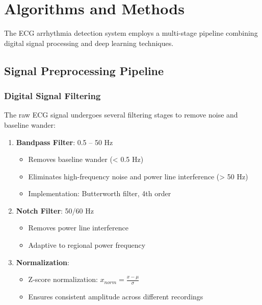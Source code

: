 \documentclass[12pt,a4paper]{article}
\begin{document}
\section{Algorithms and Methods}

The ECG arrhythmia detection system employs a multi-stage pipeline combining digital signal processing and deep learning techniques.

\subsection{Signal Preprocessing Pipeline}

\subsubsection{Digital Signal Filtering}

The raw ECG signal undergoes several filtering stages to remove noise and baseline wander:

\begin{enumerate}
    \item \textbf{Bandpass Filter}: 0.5 -- 50 Hz
    \begin{itemize}
        \item Removes baseline wander (< 0.5 Hz)
        \item Eliminates high-frequency noise and power line interference (> 50 Hz)
        \item Implementation: Butterworth filter, 4th order
    \end{itemize}
    
    \item \textbf{Notch Filter}: 50/60 Hz
    \begin{itemize}
        \item Removes power line interference
        \item Adaptive to regional power frequency
    \end{itemize}
    
    \item \textbf{Normalization}:
    \begin{itemize}
        \item Z-score normalization: $x_{norm} = \frac{x - \mu}{\sigma}$
        \item Ensures consistent amplitude across different recordings
    \end{itemize}
\end{enumerate}
\end{document}
